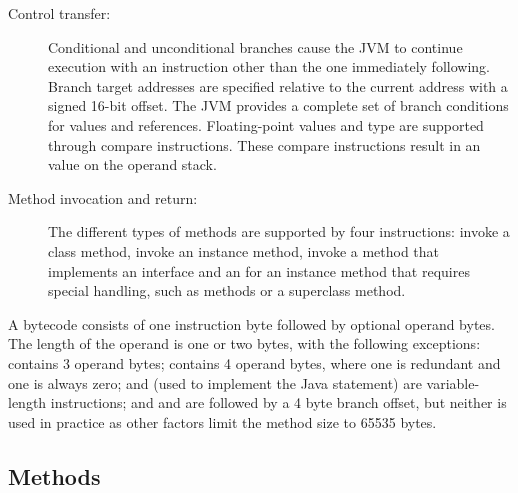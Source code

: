 \begin{description}
    \item[Control transfer:]
Conditional and unconditional branches cause the JVM to continue
execution with an instruction other than the one immediately
following. Branch target addresses are specified relative to the
current address with a signed 16-bit offset. The JVM provides a
complete set of branch conditions for  values and
references. Floating-point values and type  are
supported through compare instructions. These compare instructions
result in an  value on the operand stack.

    \item[Method invocation and return:]
The different types of methods are supported by four instructions:
invoke a class method, invoke an instance method, invoke a method
that implements an interface and an  for an
instance method that requires special handling, such as
 methods or a superclass method.


\end{description}
%
A bytecode consists of one instruction byte followed by optional
operand bytes. The length of the operand is one or two bytes, with
the following exceptions:  contains 3 operand
bytes;  contains 4 operand bytes, where one is
redundant and one is always zero;  and
 (used to implement the Java 
statement) are variable-length instructions; and  and
 are followed by a 4 byte branch offset, but neither is
used in practice as other factors limit the method size to 65535
bytes.

\subsection{Methods}


